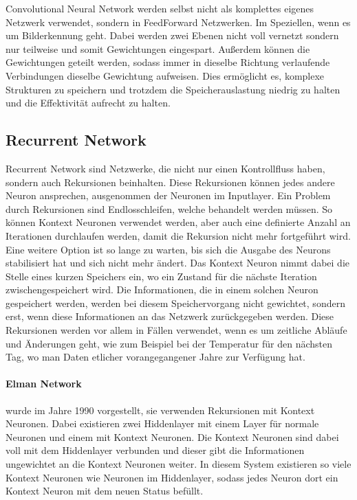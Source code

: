 Convolutional Neural Network werden selbst nicht als komplettes eigenes Netzwerk verwendet, sondern in FeedForward Netzwerken.
Im Speziellen, wenn es um Bilderkennung geht.
Dabei werden zwei Ebenen nicht voll vernetzt sondern nur teilweise und somit Gewichtungen eingespart.
Außerdem können die Gewichtungen geteilt werden, sodass immer in dieselbe Richtung verlaufende Verbindungen dieselbe Gewichtung aufweisen.
Dies ermöglicht es, komplexe Strukturen zu speichern und trotzdem die Speicherauslastung niedrig zu halten und die Effektivität aufrecht zu halten.


\subsection{Recurrent Network}

Recurrent Network sind Netzwerke, die nicht nur einen Kontrollfluss haben, sondern auch Rekursionen beinhalten. 
Diese Rekursionen können jedes andere Neuron ansprechen, ausgenommen der Neuronen im Inputlayer.
Ein Problem durch Rekursionen sind Endlosschleifen, welche behandelt werden müssen.
So können Kontext Neuronen verwendet werden, aber auch eine definierte Anzahl an Iterationen durchlaufen werden, damit die Rekursion nicht mehr fortgeführt wird. 
Eine weitere Option ist so lange zu warten, bis sich die Ausgabe des Neurons stabilisiert hat und sich nicht mehr ändert.
Das Kontext Neuron nimmt dabei die Stelle eines kurzen Speichers ein, wo ein Zustand für die nächste Iteration zwischengespeichert wird.
Die Informationen, die in einem solchen Neuron gespeichert werden, werden bei diesem Speichervorgang nicht gewichtet, sondern erst, wenn diese Informationen an das Netzwerk zurückgegeben werden.
Diese Rekursionen werden vor allem in Fällen verwendet, wenn es um zeitliche Abläufe und Änderungen geht, wie zum Beispiel bei der Temperatur für den nächsten Tag, wo man Daten etlicher vorangegangener Jahre zur Verfügung hat.

\paragraph{Elman Network} wurde im Jahre 1990 vorgestellt, sie verwenden Rekursionen mit Kontext Neuronen. 
Dabei existieren zwei Hiddenlayer mit einem Layer für normale Neuronen und einem mit Kontext Neuronen. 
Die Kontext Neuronen sind dabei voll mit dem Hiddenlayer verbunden und dieser gibt die Informationen ungewichtet an die Kontext Neuronen weiter.
In diesem System existieren so viele Kontext Neuronen wie Neuronen im Hiddenlayer, sodass jedes Neuron dort ein Kontext Neuron mit dem neuen Status befüllt.

